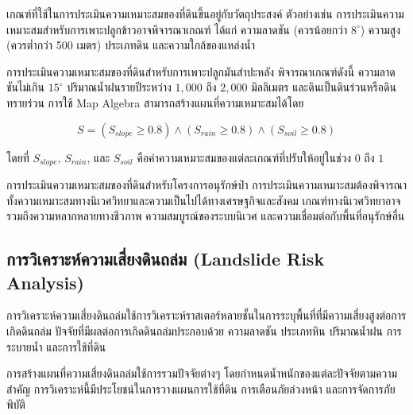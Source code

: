 เกณฑ์ที่ใช้ในการประเมินความเหมาะสมของที่ดินขึ้นอยู่กับวัตถุประสงค์ ตัวอย่างเช่น การประเมินความเหมาะสมสำหรับการเพาะปลูกข้าวอาจพิจารณาเกณฑ์ ได้แก่ ความลาดชัน (ควรน้อยกว่า $8^\circ$) ความสูง (ควรต่ำกว่า 500 เมตร) ประเภทดิน และความใกล้ของแหล่งน้ำ

\begin{ex}
การประเมินความเหมาะสมของที่ดินสำหรับการเพาะปลูกมันสำปะหลัง พิจารณาเกณฑ์ดังนี้ ความลาดชันไม่เกิน $15^\circ$ ปริมาณน้ำฝนรายปีระหว่าง $1{,}000$ ถึง $2{,}000$ มิลลิเมตร และดินเป็นดินร่วนหรือดินทรายร่วน การใช้ Map Algebra สามารถสร้างแผนที่ความเหมาะสมได้โดย

\[
S = (S_{slope} \geq 0.8) \land (S_{rain} \geq 0.8) \land (S_{soil} \geq 0.8)
\]

โดยที่ $S_{slope}$, $S_{rain}$, และ $S_{soil}$ คือค่าความเหมาะสมของแต่ละเกณฑ์ที่ปรับให้อยู่ในช่วง $0$ ถึง $1$
\end{ex}

\begin{ex}
การประเมินความเหมาะสมของที่ดินสำหรับโครงการอนุรักษ์ป่า การประเมินความเหมาะสมต้องพิจารณาทั้งความเหมาะสมทางนิเวศวิทยาและความเป็นไปได้ทางเศรษฐกิจและสังคม เกณฑ์ทางนิเวศวิทยาอาจรวมถึงความหลากหลายทางชีวภาพ ความสมบูรณ์ของระบบนิเวศ และความเชื่อมต่อกับพื้นที่อนุรักษ์อื่น
\end{ex}

\subsection{การวิเคราะห์ความเสี่ยงดินถล่ม (Landslide Risk Analysis)}

การวิเคราะห์ความเสี่ยงดินถล่มใช้การวิเคราะห์ราสเตอร์หลายชั้นในการระบุพื้นที่ที่มีความเสี่ยงสูงต่อการเกิดดินถล่ม ปัจจัยที่มีผลต่อการเกิดดินถล่มประกอบด้วย ความลาดชัน ประเภทหิน ปริมาณน้ำฝน การระบายน้ำ และการใช้ที่ดิน

การสร้างแผนที่ความเสี่ยงดินถล่มใช้การรวมปัจจัยต่างๆ โดยกำหนดน้ำหนักของแต่ละปัจจัยตามความสำคัญ การวิเคราะห์นี้มีประโยชน์ในการวางแผนการใช้ที่ดิน การเตือนภัยล่วงหน้า และการจัดการภัยพิบัติ



